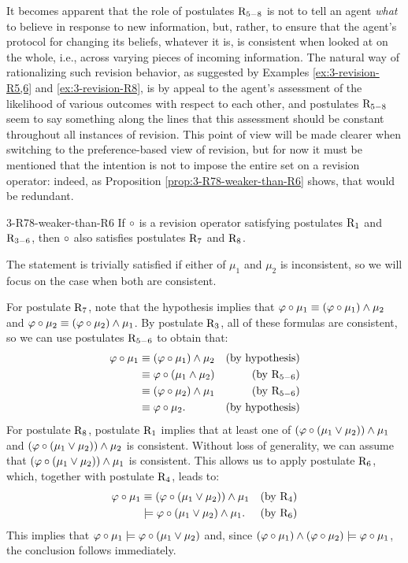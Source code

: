 It becomes apparent that the role of postulates $\mathrm{R}_{5-8}$ 
is not to tell an agent \emph{what} to believe in response to new information, 
but, rather, to ensure that the agent's protocol for changing its beliefs, 
whatever it is, is consistent when looked at on the whole,
i.e., across varying pieces of incoming information.
The natural way of rationalizing such revision behavior, 
as suggested by Examples \ref{ex:3-revision-R5,6} and \ref{ex:3-revision-R8},
is by appeal to the agent's assessment of the likelihood of various 
outcomes with respect to each other, 
and postulates $\mathrm{R}_{5-8}$ seem to say something along the lines that 
this assessment should be constant throughout all instances of revision.
This point of view will be made clearer 
when switching to the preference-based view of revision,
but for now it must be mentioned that the intention 
is not to impose the entire set on a revision operator:
indeed, as Proposition \ref{prop:3-R78-weaker-than-R6} shows,
that would be redundant.

\begin{prp}{}{3-R78-weaker-than-R6}
	If $\circ$ is a revision operator satisfying postulates $\mathrm{R}_{1}$ and $\mathrm{R}_{3-6}$,
	then $\circ$ also satisfies postulates $\mathrm{R}_{7}$ and $\mathrm{R}_{8}$.
\end{prp}
\begin{prf*}{}{}%
	The statement is trivially satisfied if either of $\mu_1$ and $\mu_2$
	is inconsistent, so we will focus on the case when both are consistent.

	For postulate $\mathrm{R}_{7}$, note that the hypothesis 
	implies that $\varphi\circ\mu_1\equiv(\varphi\circ\mu_1)\land\mu_2$
	and $\varphi\circ\mu_2\equiv(\varphi\circ\mu_2)\land\mu_1$. 
	By postulate $\mathrm{R}_{3}$, all of these formulas are consistent,	
	so we can use postulates $\mathrm{R}_{5-6}$ to obtain that:
	\begin{align*}
		\varphi\circ\mu_1 &\equiv (\varphi\circ\mu_1)\land\mu_2 &(\text{by hypothesis})\\
					 &\equiv \varphi\circ(\mu_1\land\mu_2) &(\text{by}~\mathrm{R}_{5-6})\\
					 &\equiv (\varphi\circ\mu_2)\land\mu_1 &(\text{by}~\mathrm{R}_{5-6})\\
					 &\equiv \varphi\circ\mu_2.             &(\text{by hypothesis}) 
	\end{align*}
	For postulate $\mathrm{R}_{8}$, postulate $\mathrm{R}_{1}$ 
	implies that at least one of $(\varphi\circ(\mu_1\lor\mu_2))\land\mu_1$
	and $(\varphi\circ(\mu_1\lor\mu_2))\land\mu_2$ is consistent. 
	Without loss of generality, we can assume that 
	$(\varphi\circ(\mu_1\lor\mu_2))\land\mu_1$ is consistent.
	This allows us to apply postulate $\mathrm{R}_{6}$, 
	which, together with postulate $\mathrm{R}_{4}$, leads to:
	\begin{align*}
		\varphi\circ\mu_1 &\equiv (\varphi\circ(\mu_1\lor\mu_2))\land\mu_1 &(\text{by}~\mathrm{R}_{4})\\
		             &\models \varphi\circ(\mu_1\lor\mu_2)\land\mu_1.  &(\text{by}~\mathrm{R}_{6})
	\end{align*}
	This implies that $\varphi\circ\mu_1\models\varphi\circ(\mu_1\lor\mu_2)$ and, 
	since $(\varphi\circ\mu_1)\land(\varphi\circ\mu_2)\models\varphi\circ\mu_1$, the conclusion follows immediately.
\end{prf*}

